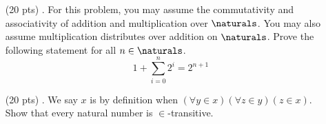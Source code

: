 \begin{enumerate}
  \item[(20 pts) \quad 5.]
    For this problem, you may assume the commutativity and associativity of addition and multiplication over $\naturals$.
    You may also assume multiplication distributes over addition on $\naturals$.
    Prove the following statement for all $n \in \naturals$.
    \begin{equation*}
      1 + \sum_{i = 0}^{n} 2^i = 2^{n + 1}
    \end{equation*}

  \item[(20 pts) \quad 6.]
    We say $x$ is  by definition when $(\forall y \in x)(\forall z \in y)(z \in x)$. \\
    Show that every natural number is $\in$-transitive.
\end{enumerate}


